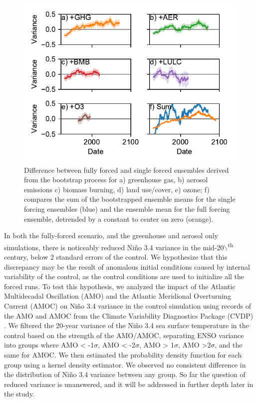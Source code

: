 \documentclass[11pt]{article}
\begin{document}
\begin{figure}[htbp]
\centering
\includegraphics[width=.9\linewidth]{./figures/bootstrap_1.pdf}
\caption{\label{fig:bootstrap_1}Difference between fully forced and single forced ensembles derived from the bootstrap process for a) greenhouse gas, b) aerosol emissions c) biomass burning, d) land use/cover, e) ozone; f) compares the sum of the bootstrapped ensemble means for the single forcing ensembles (blue) and the ensemble mean for the full forcing ensemble, detrended by a constant to center on zero (orange).}
\end{figure}

In both the fully-forced scenario, and the greenhouse and aerosol only simulations, there is noticeably reduced Niño 3.4 variance in the mid-20$\backslash$\textsuperscript{th} century, below 2 standard errors of the control. We hypothesize that this discrepancy may be the result of anomalous initial conditions caused by internal variability of the control, as the control conditions are used to initialize all the forced runs. To test this hypothesis, we analyzed the impact of the Atlantic Multidecadal Oscillation (AMO) and the Atlantic Meridional Overturning Current (AMOC) on Niño 3.4 variance in the control simulation using records of the AMO and AMOC from the Climate Variability Diagnostics Package (CVDP) \citep{phillips2014evaluating}. We filtered the 20-year variance of the Niño 3.4 sea surface temperature in the control based on the strength of the AMO/AMOC, separating ENSO variance into groups where AMO < -1\(\sigma\), AMO < -2\(\sigma\), AMO > 1\(\sigma\), AMO >2\(\sigma\), and the same for AMOC. We then estimated the probability density function for each group using a kernel density estimator. We observed no consistent difference in the distribution of Niño 3.4 variance between any group. So far the question of reduced variance is unanswered, and it will be addressed in further depth later in the study.
\end{document}

